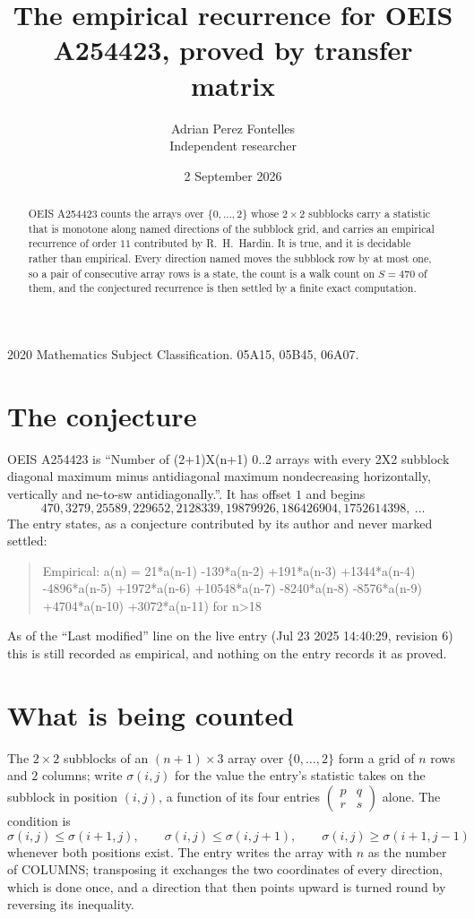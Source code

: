 \documentclass[11pt,a4paper]{article}
\title{The empirical recurrence for OEIS A254423, proved by transfer matrix}
\author{Adrian Perez Fontelles\\ \small Independent researcher}
\date{2 September 2026}
\theoremstyle{plain}
\theoremstyle{definition}
\begin{document}
\maketitle

\begin{abstract}
OEIS A254423 counts the arrays over $\{0,\dots,2\}$ whose $2\times2$ subblocks carry a
statistic that is monotone along named directions of the subblock grid, and carries an
empirical recurrence of order $11$ contributed by R.~H.~Hardin. It is true, and it is
decidable rather than empirical. Every direction named moves the subblock row by at most one,
so a pair of consecutive array rows is a state, the count is a walk count on $S=470$ of them,
and the conjectured recurrence is then settled by a finite exact computation.
\end{abstract}

\noindent\small 2020 Mathematics Subject Classification. 05A15, 05B45, 06A07.\normalsize

\section{The conjecture}

OEIS A254423 is ``Number of (2+1)X(n+1) 0..2 arrays with every 2X2 subblock diagonal maximum minus antidiagonal maximum nondecreasing horizontally, vertically and ne-to-sw antidiagonally.''. It has offset $1$ and begins
\[
470, 3279, 25589, 229652, 2128339, 19879926, 186426904, 1752614398,\ \dots
\]
The entry states, as a conjecture contributed by its author and never marked settled:
\begin{quote}
Empirical: a(n) = 21*a(n-1) -139*a(n-2) +191*a(n-3) +1344*a(n-4) -4896*a(n-5) +1972*a(n-6) +10548*a(n-7) -8240*a(n-8) -8576*a(n-9) +4704*a(n-10) +3072*a(n-11) for n>18
\end{quote}
As of the ``Last modified'' line on the live entry (Jul 23 2025 14:40:29, revision 6) this is still
recorded as empirical, and nothing on the entry records it as proved.

\section{What is being counted}

The $2\times2$ subblocks of an $(n+1)\times3$ array over $\{0,\dots,2\}$ form a grid
of $n$ rows and $2$ columns; write $\sigma(i,j)$ for the value the entry's statistic takes on
the subblock in position $(i,j)$, a function of its four entries
$\begin{pmatrix}p&q\\r&s\end{pmatrix}$ alone. The condition is
\[
\sigma(i,j)\le\sigma(i+1,j),\qquad \sigma(i,j)\le\sigma(i,j+1),\qquad \sigma(i,j)\ge\sigma(i+1,j-1)
\]
whenever both positions exist. The entry writes the array with $n$ as the number of COLUMNS; transposing it exchanges the two coordinates of every direction, which is done once, and a direction that then points upward is turned round by reversing its inequality.
\end{document}
